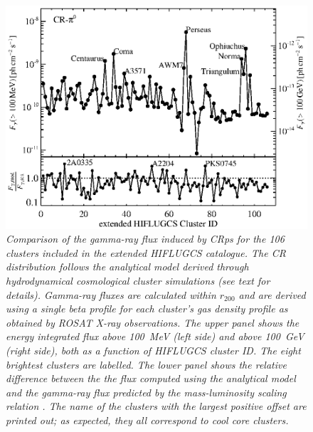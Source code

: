 \documentclass[10pt,aps,pra,reprint,amsmath,amsfonts,amssymb,showpacs,nofootinbib,floatfix]{revtex4-1}
\newcommand{\rvir}{r_{200}}
\begin{document}
\begin{figure}%
\begin{minipage}{2.0\columnwidth}
 \includegraphics[width=0.99\columnwidth]{figures/Flux.comp.CR.eps}
 \caption{\it Comparison of the gamma-ray flux induced by CRps for the
   106 clusters included in the extended HIFLUGCS catalogue.  The CR
   distribution follows the analytical model derived through
   hydrodynamical cosmological cluster simulations
   \cite{2010MNRAS.409..449P} (see text for details).  Gamma-ray
   fluxes are calculated within $\rvir$ and are derived using a single
   beta profile for each cluster's gas density profile as obtained by
   ROSAT X-ray observations. The upper panel shows the energy
   integrated flux above 100~MeV (left side) and above 100~GeV (right
   side), both as a function of HIFLUGCS cluster ID. The eight
   brightest clusters are labelled. The lower panel shows the relative
   difference between the the flux computed using the analytical model
   and the gamma-ray flux predicted by the mass-luminosity scaling
   relation \cite{2010MNRAS.409..449P}. The name of the clusters with
   the largest positive offset are printed out; as expected, they all
   correspond to cool core clusters.}
 \label{fig19}
\end{minipage}
\end{figure}
\end{document}
